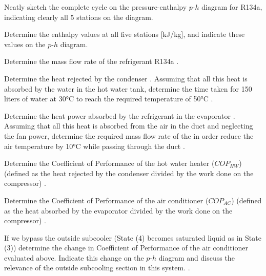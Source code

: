 \begin{homework}
  \begin{questionparts}
  \item Neatly sketch the complete cycle on the pressure-enthalpy $p$-$h$ diagram for R134a, indicating clearly all 5 stations on the diagram.
  \item Determine the enthalpy values at all five stations [kJ/kg], and indicate these values on the $p$-$h$ diagram.
  \item Determine the mass flow rate of the refrigerant R134a \answer{[0.0133 kg/s]}.
  \item Determine the heat rejected by the condenser \answer{[2.09 kW]}. Assuming that all this heat is absorbed by the water in the hot water tank, determine the time taken for 150 liters of water at 30°C to reach the required temperature of 50°C \answer{[1 hr 40 min]}.
  \item Determine the heat power absorbed by the refrigerant in the evaporator \answer{[2.04 kW]}. Assuming that all this heat is absorbed from the air in the duct and neglecting the fan power, determine the required mass flow rate of the in order reduce the air temperature by 10°C while passing through the duct \answer{[0.204 kg/s]}.
  \item Determine the Coefficient of Performance of the hot water heater ($COP_{HW}$) (defined as the heat rejected by the condenser divided by the work done on the compressor) \answer{[$COP_{HW}$ = 4.17]}.
  \item Determine the Coefficient of Performance of the air conditioner ($COP_{AC}$) (defined as the heat absorbed by the evaporator divided by the work done on the compressor) \answer{[$COP_{AC}$ = 4.07]}.
  \item If we bypass the outside subcooler (State (4) becomes saturated liquid as in State (3)) determine the change in Coefficient of Performance of the air conditioner evaluated above. Indicate this change on the $p$-$h$ diagram and discuss the relevance of the outside subcooling section in this system. .
  \end{questionparts}
\end{homework}
